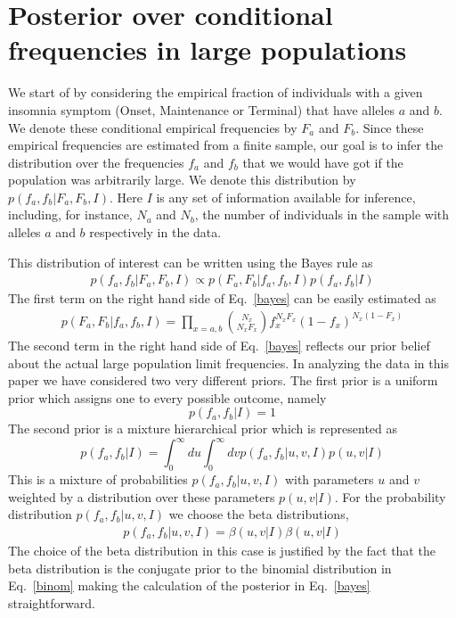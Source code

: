 \documentclass[12pt]{iopart}
\begin{document}
\section{Posterior over conditional frequencies in large populations}
We start of by considering the empirical fraction of individuals with a given insomnia symptom (Onset, Maintenance or Terminal) that have alleles $a$ and $b$. We denote these
conditional empirical frequencies by $F_a$ and $F_b$. Since these empirical frequencies are estimated from a finite sample, our goal is to infer the distribution over the frequencies $f_a$ and $f_b$ that we would have got if the population was arbitrarily large. We denote this distribution by $p(f_a,f_b| F_a,F_b, I)$. Here $I$ is any set of information available for inference, including, for instance,  $N_a$ and $N_b$, the number of individuals in the sample with alleles $a$ and $b$ respectively in the data.

This distribution of interest can be written using the Bayes rule as 
\begin{eqnarray}
p(f_a,f_b\vert F_a,F_b,  I) \propto p(F_a,F_b \vert f_a,f_b,I) p(f_a,f_b \vert I)
\label{bayes}
\end{eqnarray}
The first term on the right hand side of Eq.\ \ref{bayes} can be easily estimated as 
\begin{eqnarray}
p(F_a,F_b\vert f_a,f_b,I)  = \prod_{x=a,b} {N_x \choose N_x F_x} f^{N_x F_x}_x (1-f_x)^{N_x (1-F_x)}
\label{binom}
\end{eqnarray}
The second term in the right hand side of Eq.\ \ref{bayes} reflects our prior belief about the actual large population limit frequencies. In analyzing the data in this paper
we have considered two very different priors. The first prior is a uniform prior which assigns one to every possible outcome, namely
\begin{equation}
p(f_a,f_b \vert I) = 1
\label{uniform}
\end{equation} 
The second prior is a mixture hierarchical prior which is represented as
\begin{equation}
p(f_a,f_b\vert I) = \int^{\infty}_0 du \int^{\infty}_0 dv p(f_a,f_b\vert u ,v, I) p(u,v\vert I)
\label{priorbeta}
\end{equation}
This is a mixture of probabilities $p(f_a,f_b| u ,v, I)$ with parameters $u$ and $v$ weighted by a distribution over these 
parameters $p(u,v|I)$. For the probability distribution  $p(f_a,f_b| u ,v, I)$ we choose the beta distributions,
\begin{eqnarray}
p(f_a,f_b\vert u ,v, I) = \beta(u,v \vert I) \beta(u,v\vert I)
\label{beta}
\end{eqnarray}
The choice of the beta distribution in this case is justified by the fact that the beta distribution is the conjugate prior to the binomial 
distribution in Eq.\ \ref{binom} making the calculation of the posterior in Eq.\ \ref{bayes} straightforward. 
\end{document}
